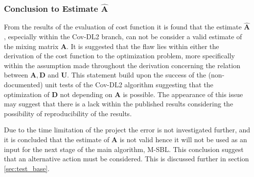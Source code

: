 \subsubsection{Conclusion to Estimate $\hat{\mathbf{A}}$}
From the results of the evaluation of cost function it is found that the estimate $\hat{\mathbf{A}}$, especially within the Cov-DL2 branch, can not be consider a valid estimate of the mixing matrix $\mathbf{A}$. 
It is suggested that the flaw lies within either the  derivation of the cost function to the optimization problem, more specifically within the assumption made throughout the derivation concerning the relation between $\mathbf{A}, \mathbf{D}$ and $\mathbf{U}$. 
This statement build upon the success of the (non-documented) unit tests of the Cov-DL2 algorithm suggesting that the optimization of $\mathbf{D}$ not depending on $\mathbf{A}$ is possible.
The appearance of this issue may suggest that there is a lack within the published results \cite{Balkan2015} considering the possibility of reproducibility of the results.  

Due to the time limitation of the project the error is not investigated further, and it is concluded that the estimate of $\mathbf{A}$ is not valid hence it will not be used as an input for the next stage of the main algorithm, M-SBL. This conclusion suggest that an alternative action must be considered. This is discussed further in section \ref{sec:test_base}.

